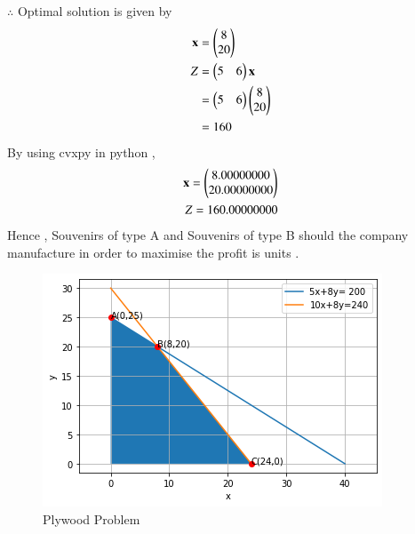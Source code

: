 \documentclass[journal,12pt,twocolumn]{IEEEtran}
\begin{document}
$\therefore$ Optimal solution is given by
\begin{align}
    \mathbf{x} &= \begin{pmatrix}8\\20\end{pmatrix} \\
    Z &= \begin{pmatrix}5 & 6\end{pmatrix}\mathbf{x} \\
    &= \begin{pmatrix}5 & 6\end{pmatrix}\begin{pmatrix}8 \\ 20\end{pmatrix} \\
    &= 160
\end{align}
By using cvxpy in python ,
\begin{align}
    \mathbf{x}=\begin{pmatrix}8.00000000\\20.00000000\end{pmatrix}\\
    Z = 160.00000000
\end{align}
Hence , Souvenirs of type A and  Souvenirs of type B should the company manufacture in order to maximise the profit is  units .
\begin{figure}[H]
\centering
\includegraphics[width=\columnwidth]{Diagram.png}
\caption{Plywood Problem}
\label{fig:Plywood problem}	
\end{figure}
\end{document}
